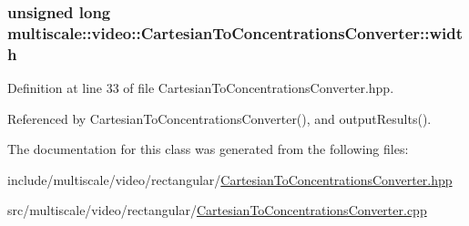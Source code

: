 \hypertarget{classmultiscale_1_1video_1_1CartesianToConcentrationsConverter_ae6fba5af405d884c7b70ed206a6d5cb1}{
\subsubsection[{width}]{\setlength{\rightskip}{0pt plus 5cm}unsigned long multiscale\-::video\-::\-Cartesian\-To\-Concentrations\-Converter\-::width\hspace{0.3cm}{\ttfamily [private]}}}\label{classmultiscale_1_1video_1_1CartesianToConcentrationsConverter_ae6fba5af405d884c7b70ed206a6d5cb1}


Definition at line 33 of file Cartesian\-To\-Concentrations\-Converter.\-hpp.



Referenced by Cartesian\-To\-Concentrations\-Converter(), and output\-Results().



The documentation for this class was generated from the following files\-:\begin{DoxyCompactItemize}
\item 
include/multiscale/video/rectangular/\hyperlink{CartesianToConcentrationsConverter_8hpp}{Cartesian\-To\-Concentrations\-Converter.\-hpp}\item 
src/multiscale/video/rectangular/\hyperlink{CartesianToConcentrationsConverter_8cpp}{Cartesian\-To\-Concentrations\-Converter.\-cpp}\end{DoxyCompactItemize}
